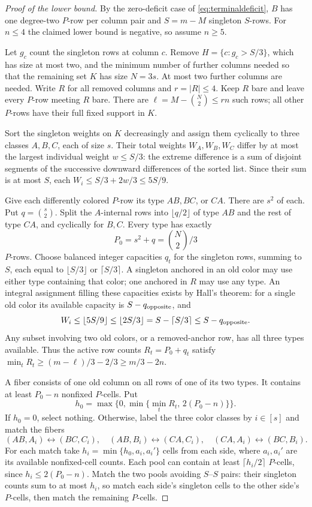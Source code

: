 \documentclass[11pt]{article}
\begin{document}
\begin{proof}[Proof of the lower bound]
By the zero-deficit case of \eqref{eq:terminaldeficit}, $B$ has one degree-two
$P$-row per column pair and $S=m-M$ singleton $S$-rows. For $n\le4$ the
claimed lower bound is negative, so assume $n\ge5$.

Let $g_c$ count the singleton rows at column $c$. Remove
$H=\{c:g_c>S/3\}$, which has size at most two, and the minimum number
of further columns needed so that the remaining set $K$ has size $N=3s$.
At most two further columns are needed. Write $R$ for
all removed columns and $r=|R|\le4$. Keep $R$ bare and leave every
$P$-row meeting $R$ bare. There are
$\ell=M-\binom N2\le rn$ such rows; all other $P$-rows have their
full fixed support in $K$.

Sort the singleton weights on $K$ decreasingly and assign them cyclically
to three classes $A,B,C$, each of size $s$. Their total weights
$W_A,W_B,W_C$ differ by at most the largest individual weight
$w\le S/3$: the extreme difference is a sum of disjoint segments of
the successive downward differences of the sorted list. Since their
sum is at most $S$, each $W_i\le S/3+2w/3\le5S/9$.

Give each differently colored $P$-row its type $AB,BC$, or $CA$.
There are $s^2$ of each. Put $q=\binom s2$. Split the $A$-internal
rows into $\lfloor q/2\rfloor$ of type $AB$ and the rest of type $CA$,
and cyclically for $B,C$. Every type has exactly
\[
 P_0=s^2+q=\binom N2/3
\]
$P$-rows. Choose balanced integer capacities $q_t$ for the singleton
rows, summing to $S$, each equal to $\lfloor S/3\rfloor$ or
$\lceil S/3\rceil$. A singleton anchored in an old color may use either
type containing that color; one anchored in $R$ may use any type.
An integral assignment filling these capacities exists by Hall's theorem:
for a single old color its available capacity is $S-q_{\rm opposite}$,
and
\[
 W_i\le\lfloor5S/9\rfloor\le\lfloor2S/3\rfloor
      =S-\lceil S/3\rceil\le S-q_{\rm opposite}.
\]
Any subset involving two old colors, or a removed-anchor row, has all
three types available. Thus the active row counts $R_t=P_0+q_t$ satisfy
$\min_tR_t\ge(m-\ell)/3-2/3\ge m/3-2n$.

A fiber consists of one old column on all rows of one of its two types.
It contains at least $P_0-n$ nonfixed $P$-cells. Put
\[
 h_0=\max\{0,\min\{\min_tR_t,\,2(P_0-n)\}\}.
\]
If $h_0=0$, select nothing. Otherwise, label the three color classes
by $i\in[s]$ and match the fibers
\[
 (AB,A_i)\leftrightarrow(BC,C_i),\quad
 (AB,B_i)\leftrightarrow(CA,C_i),\quad
 (CA,A_i)\leftrightarrow(BC,B_i).
\]
For each match take $h_i=\min\{h_0,a_i,a_i'\}$ cells from each side,
where $a_i,a_i'$ are its available nonfixed-cell counts. Each pool can
contain at least $\lceil h_i/2\rceil$ $P$-cells, since
$h_i\le2(P_0-n)$. Match the two pools avoiding $S$--$S$ pairs: their
singleton counts sum to at most $h_i$, so match each side's singleton
cells to the other side's $P$-cells, then match the remaining $P$-cells.


\end{proof}
\end{document}

